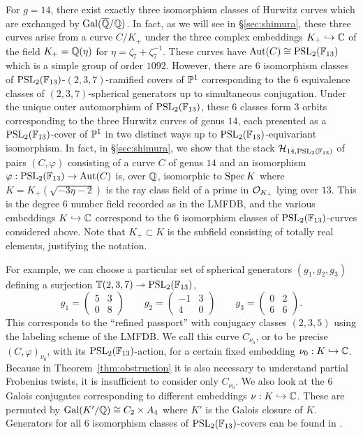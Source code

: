 \documentclass[main.tex]{subfiles}
\begin{document}
For $g = 14$, there exist exactly three isomorphism classes of Hurwitz curves which are exchanged by $\Gal(\ol{\Q} / \Q)$. In fact, as we will see in \S\ref{sec:shimura}, these three curves arise from a curve $C / K_+$ under the three complex embeddings $K_+ \embed \CC$ of the field $K_+ = \Q(\eta)$ for $\eta = \zeta_7 + \zeta_7^{-1}$. These curves have $\Aut(C) \cong \PSL_2(\FF_{13})$ which is a simple group of order $1092$. However, there are $6$ isomorphism classes of $\PSL_2(\FF_{13})$-\Belyi $(2,3,7)$-ramified covers of $\P^1$ corresponding to the $6$ equivalence classes of $(2,3,7)$-spherical generators up to simultaneous conjugation. Under the unique outer automorphism of $\PSL_2(\FF_{13})$, these $6$ classes form $3$ orbits  corresponding to the three Hurwitz curves of genus $14$, each presented as a $\PSL_2(\FF_{13})$-cover of $\P^1$ in two distinct ways up to $\PSL_2(\FF_{13})$-equivariant isomorphism. In fact, in  \S\ref{sec:shimura}, we show that the stack $\mathcal{H}_{14, \PSL_2(\FF_{13})}$ of pairs $(C, \varphi)$ consisting of a curve $C$ of genus $14$ and an isomorphism $\varphi : \PSL_2(\FF_{13}) \to \Aut(C)$ is, over $\Q$, isomorphic to $\Spec{K}$ where $K = K_+(\sqrt{-3\eta -2})$ is the ray class field of a prime in $\cO_{K_+}$ lying over $13$. This is the degree $6$ number field recorded as \cite{lmfdb:nf-6.2.31213.1} in the LMFDB, and the various embeddings $K \embed \CC$ correspond to the $6$ isomorphism classes of $\PSL_2(\FF_{13})$-\Belyi curves considered above. Note that $K_+ \subset K$ is the subfield consisting of totally real elements, justifying the notation. 
\par 
For example, we can choose a particular set of spherical generators $(g_1, g_2, g_3)$ defining a surjection $\TT(2,3,7) \onto \PSL_2(\FF_{13})$,
\[ g_1 = \begin{pmatrix}
    5 & 3
    \\
    0 & 8
\end{pmatrix}
\quad \quad 
g_2 = \begin{pmatrix}
-1 & 3
\\
4 & 0
\end{pmatrix}
\quad \quad 
g_3 = \begin{pmatrix}
0 & 2
\\
6 & 6
\end{pmatrix}.
\]
This corresponds to the ``refined passport'' \cite{lmfdb:hgcwa-14.1092-25.0.2-3-7.1} with conjugacy classes $(2,3,5)$ using the labeling scheme of the LMFDB. We call this curve $C_{\nu_0}$, or to be precise $(C, \varphi)_{\nu_0}$, with its $\PSL_2(\FF_{13})$-action, for a certain fixed embedding $\nu_0 : K \embed \CC$. Because in Theorem~\ref{thm:obstruction} it is also necessary to understand partial Frobenius twists, it is insufficient to consider only $C_{\nu_0}$. We also look at the $6$ Galois conjugates corresponding to different embeddings $\nu : K \embed \CC$. These are permuted by $\Gal(K'/\Q) \cong C_2 \times A_4$ where $K'$ is the Galois closure of $K$. Generators for all $6$ isomorphism classes of $\PSL_2(\FF_{13})$-\Belyi covers can be found in \cite{lmfdb:hgcwa-14.1092-25.0.2-3-7}.
\end{document}

